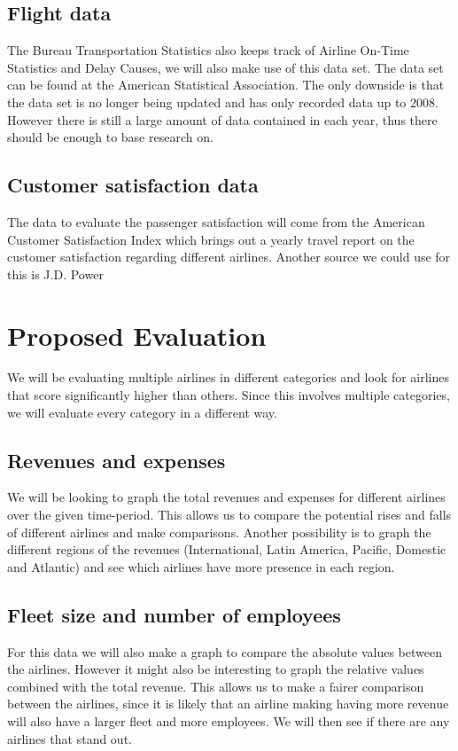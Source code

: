 \documentclass[11pt,oneside]{book}
\begin{document}
\section*{Flight data}
The Bureau Transportation Statistics also keeps track of Airline On-Time Statistics and Delay Causes, we will also make use of this data set. The data set can be found at the American Statistical Association\cite{asa}. The only downside is that the data set is no longer being updated and has only recorded data up to 2008. However there is still a large amount of data contained in each year, thus there should be enough to base research on. 
\section*{Customer satisfaction data} 
\indent The data to evaluate the passenger satisfaction will come from the American Customer Satisfaction Index\cite{acsi} which brings out a yearly travel report on the customer satisfaction regarding different airlines. Another source we could use for this is J.D. Power\cite{jdpower}

\chapter{Proposed Evaluation} 
We will be evaluating multiple airlines in different categories and look for airlines that score significantly higher than others. Since this involves multiple categories, we will evaluate every category in a different way.
\section*{Revenues and expenses}
We will be looking to graph the total revenues and expenses for different airlines over the given time-period. This allows us to compare the potential rises and falls of different airlines and make comparisons. Another possibility is to graph the different regions of the revenues (International, Latin America, Pacific, Domestic and Atlantic) and see which airlines have more presence in each region. 
\section*{Fleet size and number of employees}
For this data we will also make a graph to compare the absolute values between the airlines. However it might also be interesting to graph the relative values combined with the total revenue. This allows us to make a fairer comparison between the airlines, since it is likely that an airline making having more revenue will also have a larger fleet and more employees. We will then see if there are any airlines that stand out. 
\end{document}
